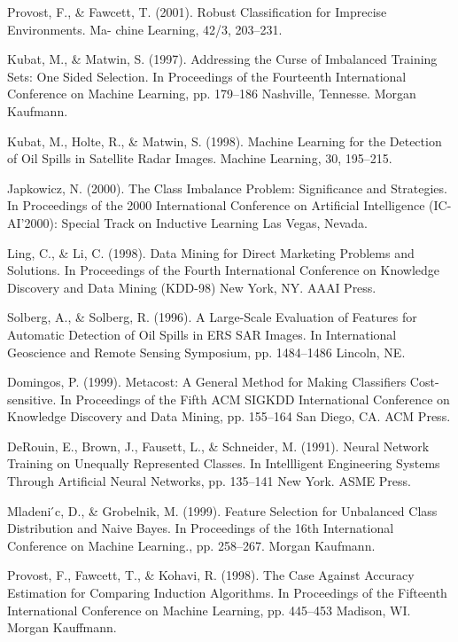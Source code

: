\documentclass[10pt,journal,compsoc]{IEEEtran}
\begin{document}
\begin{thebibliography}{10}
Provost, F., \& Fawcett, T. (2001). Robust Classification for Imprecise Environments. Ma- chine Learning, 42/3, 203–231.

Kubat, M., \& Matwin, S. (1997). Addressing the Curse of Imbalanced Training Sets: One Sided Selection. In Proceedings of the Fourteenth International Conference on Machine Learning, pp. 179–186 Nashville, Tennesse. Morgan Kaufmann.

Kubat, M., Holte, R., \& Matwin, S. (1998). Machine Learning for the Detection of Oil Spills in Satellite Radar Images. Machine Learning, 30, 195–215.

Japkowicz, N. (2000). The Class Imbalance Problem: Significance and Strategies. In Proceedings of the 2000 International Conference on Artificial Intelligence (IC-AI’2000): Special Track on Inductive Learning Las Vegas, Nevada.

Ling, C., \& Li, C. (1998). Data Mining for Direct Marketing Problems and Solutions. In
Proceedings of the Fourth International Conference on Knowledge Discovery and Data Mining (KDD-98) New York, NY. AAAI Press.

Solberg, A., \& Solberg, R. (1996). A Large-Scale Evaluation of Features for Automatic Detection of Oil Spills in ERS SAR Images. In International Geoscience and Remote Sensing Symposium, pp. 1484–1486 Lincoln, NE.

Domingos, P. (1999). Metacost: A General Method for Making Classifiers Cost-sensitive. In Proceedings of the Fifth ACM SIGKDD International Conference on Knowledge Discovery and Data Mining, pp. 155–164 San Diego, CA. ACM Press.

DeRouin, E., Brown, J., Fausett, L., \& Schneider, M. (1991). Neural Network Training on Unequally Represented Classes. In Intellligent Engineering Systems Through Artificial Neural Networks, pp. 135–141 New York. ASME Press.

Mladeni ́c, D., \& Grobelnik, M. (1999). Feature Selection for Unbalanced Class Distribution and Naive Bayes. In Proceedings of the 16th International Conference on Machine Learning., pp. 258–267. Morgan Kaufmann.

Provost, F., Fawcett, T., \& Kohavi, R. (1998). The Case Against Accuracy Estimation for Comparing Induction Algorithms. In Proceedings of the Fifteenth International Conference on Machine Learning, pp. 445–453 Madison, WI. Morgan Kauffmann.

\end{thebibliography}
\end{document}
